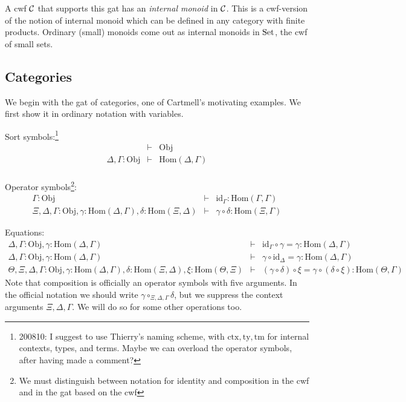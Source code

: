\documentclass{lmcs}
\def\Obj{\mathrm{Obj}}
\def\Ctx{\mathrm{Ctx}}
\def\Hom{\mathrm{Hom}}
\def\id{\mathrm{id}}
\newcommand{\ctx}{\mathrm{ctx}}
\newcommand{\ty}{\mathrm{ty}}
\newcommand{\tm}{\mathrm{tm}}
\begin{document}
A cwf ${\mathcal C}$ that supports this gat has an {\em internal monoid} in ${\mathcal C}$. This is a cwf-version of the notion of internal monoid which can be defined in any category with finite products. Ordinary (small) monoids come out as internal monoids in ${\rm Set}$, the cwf of small sets.

\subsection{Categories} We begin with the gat of categories, one of Cartmell's motivating examples. We first show it in ordinary notation with variables.

Sort symbols:\footnote{200810: I suggest to use Thierry's naming scheme, with $\ctx, \ty, \tm$ for internal contexts, types, and terms. Maybe we can overload the operator symbols, after having made a comment?}
\begin{eqnarray*}
&\vdash& \Obj\\
\Delta, \Gamma : \Obj &\vdash& \Hom(\Delta,\Gamma)\\
\end{eqnarray*}

Operator symbols\footnote{We must distinguish between notation for identity and composition in the cwf and in the gat based on the cwf}:
\begin{eqnarray*}
\Gamma : \Obj &\vdash& \id_\Gamma : \Hom(\Gamma,\Gamma)\\
\Xi,\Delta,\Gamma : \Obj, \gamma : \Hom(\Delta,\Gamma), \delta : \Hom(\Xi,\Delta) &\vdash&
\gamma \circ \delta : \Hom(\Xi,\Gamma)
\end{eqnarray*}

Equations:
\begin{eqnarray*}
\Delta, \Gamma : \Obj, \gamma : \Hom(\Delta,\Gamma) &\vdash& \id_\Gamma \circ \gamma = \gamma : \Hom(\Delta,\Gamma)\\
\Delta, \Gamma : \Obj, \gamma : \Hom(\Delta,\Gamma) &\vdash& \gamma \circ \id_\Delta = \gamma : \Hom(\Delta,\Gamma)\\
\Theta, \Xi,\Delta,\Gamma : \Obj, \gamma : \Hom(\Delta,\Gamma), \delta : \Hom(\Xi,\Delta), \xi : \Hom(\Theta,\Xi) &\vdash&
(\gamma \circ \delta) \circ \xi = \gamma \circ (\delta \circ \xi): \Hom(\Theta,\Gamma)
\end{eqnarray*}
Note that composition is officially an operator symbols with five arguments. In the official notation we should write $\gamma \circ_{\Xi,\Delta,\Gamma} \delta$, but we suppress the context arguments $\Xi,\Delta,\Gamma$. We will do so for some other operations too.
\end{document}
